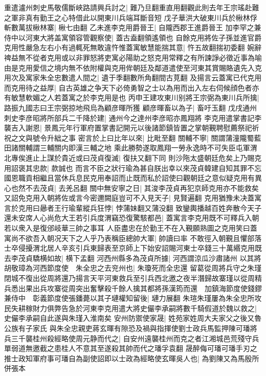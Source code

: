 重遣瀘州刺史馬敬儒斷峽路請興兵討之|{
	難乃旦翻重直用翻觀此則去年王宗瑤赴難之軍非真有勤王之心特借此以開東川兵端耳斷音短}
戊子華洪大破東川兵於楸林俘斬數萬拔楸林寨|{
	楸七由翻}
乙未進李克用爵晉王|{
	自隴西郡王進爵晉王}
加李罕之兼侍中以河東大將盖寓領容管觀察使|{
	蓋古盍翻領遙領也}
自餘克用將佐子孫並進官爵克用性嚴急左右小有過輒死無敢違忤惟蓋寓敏慧能揣其意|{
	忤五故翻揣初委翻}
婉辭禆益無不從者克用或以非罪怒將吏寓必陽助之怒克用常釋之有所諫諍必徵近事為喻由是克用愛信之境内無不依附權與克用侔朝廷及鄰道遣使至河東其賞賜賂遺先入克用次及寓家朱全忠數遣人間之|{
	遺于季翻數所角翻間古莧翻}
及揚言云蓋寓已代克用而克用待之益厚|{
	自古英雄之争天下必倚勇智之士以為用而出入左右伺候顔色者亦有敏慧軟媚之人若蓋寓之於李克用是也}
丙申王建攻東川别將王宗弼為東川兵所擒|{
	路振九國志曰王宗弼掠地飛烏為顧彦暉所獲}
顧彦暉畜以為子|{
	畜吁玉翻}
戊戌通州刺史李彦昭將所部兵二千降於建|{
	通州今之達州李彦昭亦鳳翔將}
李克用遣掌書記李襲吉入謝恩|{
	景鳳元年行軍府置掌書記開元以後諸節鎮皆置之掌朝覲聘慰薦祭祀祈祝之文與號令升絀之事}
密言於上曰比年以來|{
	比毗至翻}
關輔不寧|{
	關謂蒲潼隴蜀藍田諸關輔謂三輔關内即漢三輔之地}
乘此勝勢遂取鳳翔一勞永逸時不可失臣屯軍渭北專俟進止上謀於貴近或曰茂貞復滅|{
	復扶又翻下同}
則沙陁太盛朝廷危矣上乃賜克用詔褒其忠款|{
	款誠也}
而言不臣之狀行瑜為甚自朕出幸以來茂貞韓建自知其罪不忘國恩職貢相繼且當休兵息民克用奉詔而止既而私於詔使曰觀朝廷之意似疑克用有異心也然不去茂貞|{
	去羌呂翻}
關中無安寧之日|{
	其浚李茂貞再犯京師克用亦不能救矣}
又詔免克用入朝將佐或言今密邇闕庭豈可不入見天子|{
	見賢遍翻}
克用猶豫未决蓋寓言於克用曰曏者王行瑜輩縱兵狂悖|{
	悖蒲妹翻又蒲没翻}
致鑾輿播越百姓奔散今天子還未安席人心尚危大王若引兵度渭竊恐復驚駭都邑|{
	蓋寓言李克用既不可釋兵入朝若以衆入是復邠岐華三帥之事耳}
人臣盡忠在於勤王不在入覲願熟圖之克用笑曰蓋寓尚不欲吾入朝况天下之人乎乃表稱臣總帥大軍|{
	帥讀曰率}
不敢徑入朝覲且懼部落士卒侵擾渭北居人辛亥引兵東歸表至京師上下始安詔賜河東士卒錢三十萬緡克用既去李茂貞驕横如故|{
	横下孟翻}
河西州縣多為茂貞所據|{
	河西謂涼瓜沙肅諸州}
以其將胡敬璋為河西節度使　朱全忠之去兖州也|{
	朱瓊死而全忠還}
留葛從周將兵守之朱瑾閉城不復出從周將還乃揚言天平河東救兵至引兵西北邀之夜半潛歸故寨瑾以從周精兵悉出果出兵攻寨從周突出奮擊殺千餘人擒其都將孫漢筠而還　加鎮海節度使錢鏐兼侍中　彰義節度使張鐇薨以其子璉權知留後|{
	璉力展翻}
朱瑄朱瑾屢為朱全忠所攻民失耕稼財力俱弊告急於河東李克用遣大將史儼李承嗣將數千騎假道於魏以救之|{
	史儼李承嗣自此遂與朱瑾入淮南矣}
安州防禦使家晟|{
	姓苑家姓周大夫家父之後又魯公族有子家氏}
與朱全忠親吏蔣玄暉有隙恐及禍與指揮使劉士政兵馬監押陳可璠將兵三千襲桂州殺經略使周元静而代之|{
	自安州遠襲桂州而克之者江湘城邑荒殘守兵單弱道無邀截之患桂人不意其至遂殺其帥而代之璠孚袁翻}
晟醉侮可璠可璠手刃之推士政知軍府事可璠自為副使詔即以士政為經略使玄暉吳人也|{
	為劉陳又為馬殷所併張本}


